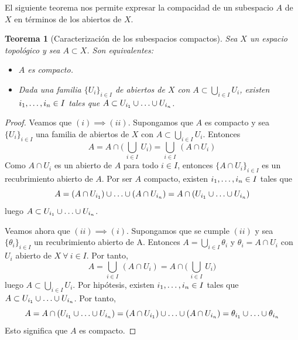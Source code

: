 \documentclass[12pt]{report}
\newtheorem{theorem}{Teorema}[chapter]
\theoremstyle{definition}
\theoremstyle{definition}
\theoremstyle{remark}
\begin{document}
El siguiente teorema nos permite expresar la compacidad de un subespacio $A$ de $X$ en términos de los abiertos de $X$.
\begin{theorem}[Caracterización de los subespacios compactos]
Sea $X$ un espacio topológico y sea $A \subset X$. Son equivalentes:
\begin{itemize}
    \item[(i)] $A$ es compacto.
    \item[(ii)] Dada una familia $\{U_i\}_{i \in I}$ de abiertos de $X$ con $A \subset \bigcup_{i \in I}U_i$, existen $i_1,\mathellipsis,i_n \in I$ tales que $A \subset U_{i_1} \cup \mathellipsis \cup U_{i_n}$.
\end{itemize}
\end{theorem}

\begin{proof}

Veamos que $(i) \implies (ii)$. Supongamos que $A$ es compacto y sea $\{U_i\}_{i \in I}$  una familia de abiertos de $X$ con $A \subset \bigcup_{i \in I}U_i$. Entonces 
\[A = A \cap \biggl( \, \bigcup_{i \in I} \, U_i \biggr) = \bigcup_{i \in I} \, (A \cap U_i)\]
Como $A \cap U_i$ es un abierto de $A$ para todo $i \in I$, entonces $\{A \cap U_i\}_{i \in I}$ es un recubrimiento abierto de $A$. Por ser $A$ compacto, existen $i_1,\mathellipsis,i_n \in I$ tales que 
\[A = (A \cap U_{i_1}) \cup \mathellipsis \cup (A \cap U_{i_n}) = A \cap (U_{i_1} \cup \mathellipsis \cup U_{i_n})\]
luego $A \subset U_{i_1} \cup \mathellipsis \cup U_{i_n}$.

\vspace{2mm}
Veamos ahora que $(ii) \implies (i)$. Supongamos que se cumple $(ii)$ y sea $\{\theta_i\}_{i \in I}$ un recubrimiento abierto de A. Entonces $A = \bigcup_{i \in I}\theta_i$ y $\theta_i = A \cap U_i$ con $U_i$ abierto de $X \ \forall \ i \in I$. Por tanto,
\[A = \bigcup_{i \in I} \, (A \cap U_i) = A \cap \biggl( \, \bigcup_{i \in I} \, U_i \biggr)\]
luego $A \subset \bigcup_{i \in I}U_i$. Por hipótesis, existen $i_1,\mathellipsis,i_n \in I$ tales que $A \subset U_{i_1} \cup \mathellipsis \cup U_{i_n}$. Por tanto,
\[A = A \cap (U_{i_1} \cup \mathellipsis \cup U_{i_n}) = (A \cap U_{i_1}) \cup \mathellipsis \cup (A \cap U_{i_n}) = \theta_{i_1} \cup \mathellipsis \cup \theta_{i_n}\] 
Esto significa que $A$ es compacto.
\end{proof}
\end{document}
